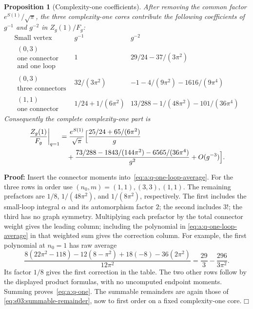 \documentclass[a4paper,10pt]{article}
\numberwithin{equation}{section}
\theoremstyle{paperplain}
\newtheorem{prp}[thm]{Proposition}
\theoremstyle{paperremark}
\theoremstyle{paperplain}
\newenvironment{prf}{\noindent \textbf{Proof: }}{\hfill $\mdlgwhtsquare$\par\addvspace{0.5\baselineskip}}
\begin{document}
\begin{prp}[Complexity-one coefficients]\label{prp:a:q-one}
After removing the common factor $e^{S(1)}/\sqrt\pi$, the three
complexity-one cores contribute the following coefficients of
$g^{-1}$ and $g^{-2}$ in $Z_g(1)/F_g$:
\begin{equation}\label{eq:a:q-one-table}
\begin{array}{c|c|c}
 \text{Small vertex}&g^{-1}&g^{-2}\\\hline
 \begin{gathered}(0,3)\\\text{one connector}\\\text{and one loop}\end{gathered}
 &1&29/24-37/(3\pi^2)\\
 \begin{gathered}(0,3)\\\text{three connectors}\end{gathered}
 &32/(3\pi^2)&-1-4/(9\pi^2)-1616/(9\pi^4)\\
 \begin{gathered}(1,1)\\\text{one connector}\end{gathered}
 &1/24+1/(6\pi^2)&13/288-1/(48\pi^2)-101/(36\pi^4)
\end{array}
\end{equation}
Consequently the complete complexity-one part is
\begin{equation}\label{eq:a:q-one}
\begin{aligned}
 \left.\frac{Z_g(1)}{F_g}\right|_{q=1}
 &=\frac{e^{S(1)}}{\sqrt\pi}\Bigl[
   \frac{25/24+65/(6\pi^2)}g\\
 &\quad+\frac{73/288-1843/(144\pi^2)-6565/(36\pi^4)}{g^2}
   +O(g^{-3})\Bigr].
\end{aligned}
\end{equation}
\end{prp}
\begin{prf}
Insert the connector moments into~\eqref{eq:a:q-one-loop-average}.
For the three rows in order use $(n_0,m)=(1,1),(3,3),(1,1)$.
The remaining prefactors are $1/8$, $1/(48\pi^2)$, and
$1/(8\pi^2)$, respectively. The first includes the small-loop integral
$\alpha$ and its automorphism factor $2$; the second includes $3!$;
the third has no graph symmetry.
Multiplying each prefactor by the total connector weight gives the
leading column; including the polynomial in
\eqref{eq:a:q-one-loop-average} in that weighted sum gives the
correction column.
For example, the first polynomial at $n_0=1$ has raw average
\[
 \frac{8(22\pi^2-118)-12(8-\pi^2)+18(-8)
                   -36(2\pi^2)}{12\pi^2}
 =\frac{29}{3}-\frac{296}{3\pi^2}.
\]
Its factor $1/8$ gives the first correction in the table. The two
other rows follow by the displayed product formulas, with no
uncomputed endpoint moments. Summing proves~\eqref{eq:a:q-one}.
The summable remainders are again those of
\eqref{eq:s03:summable-remainder}, now to first order on a fixed
complexity-one core.
\end{prf}
\end{document}
